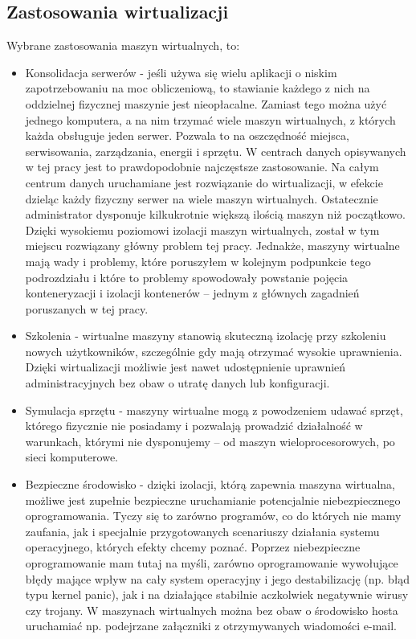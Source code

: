 \documentclass[10pt,a4paper,titlepage,twoside]{report}
\begin{document}
\subsection{Zastosowania wirtualizacji}\indent \indent Wybrane zastosowania maszyn wirtualnych, to:
\begin{itemize}
	\item Konsolidacja serwerów - jeśli używa się wielu aplikacji o niskim zapotrzebowaniu na moc obliczeniową, to stawianie każdego z nich na oddzielnej fizycznej maszynie jest nieopłacalne. Zamiast tego można użyć jednego komputera, a na nim trzymać wiele maszyn wirtualnych, z których każda obsługuje jeden serwer. Pozwala to na oszczędność miejsca, serwisowania, zarządzania, energii i sprzętu. W centrach danych opisywanych w tej pracy jest to prawdopodobnie najczęstsze zastosowanie. Na całym centrum danych uruchamiane jest rozwiązanie do wirtualizacji, w efekcie dzieląc każdy fizyczny serwer na wiele maszyn wirtualnych. Ostatecznie administrator dysponuje kilkukrotnie większą ilością maszyn niż początkowo. Dzięki wysokiemu poziomowi izolacji maszyn wirtualnych, został w tym miejscu rozwiązany główny problem tej pracy. Jednakże, maszyny wirtualne mają wady i problemy, które poruszyłem w kolejnym podpunkcie tego podrozdziału i które to problemy spowodowały powstanie pojęcia konteneryzacji i izolacji kontenerów – jednym z głównych zagadnień poruszanych w tej pracy.
	\item Szkolenia - wirtualne maszyny stanowią skuteczną izolację przy szkoleniu nowych użytkowników, szczególnie gdy mają otrzymać wysokie uprawnienia. Dzięki wirtualizacji możliwie jest nawet udostępnienie uprawnień administracyjnych bez obaw o utratę danych lub konfiguracji.
	\item Symulacja sprzętu - maszyny wirtualne mogą z powodzeniem udawać sprzęt, którego fizycznie nie posiadamy i pozwalają prowadzić działalność w warunkach, którymi nie dysponujemy – od maszyn wieloprocesorowych, po sieci komputerowe.
	\item Bezpieczne środowisko - dzięki izolacji, którą zapewnia maszyna wirtualna, możliwe jest zupełnie bezpieczne uruchamianie potencjalnie niebezpiecznego oprogramowania. Tyczy się to zarówno programów, co do których nie mamy zaufania, jak i specjalnie przygotowanych scenariuszy działania systemu operacyjnego, których efekty chcemy poznać. Poprzez niebezpieczne oprogramowanie mam tutaj na myśli, zarówno oprogramowanie wywołujące błędy mające wpływ na cały system operacyjny i jego destabilizację (np. błąd typu kernel panic), jak i na działające stabilnie aczkolwiek negatywnie wirusy czy trojany. W maszynach wirtualnych można bez obaw o środowisko hosta uruchamiać np. podejrzane załączniki z otrzymywanych wiadomości e-mail.

\end{itemize}
\end{document}
